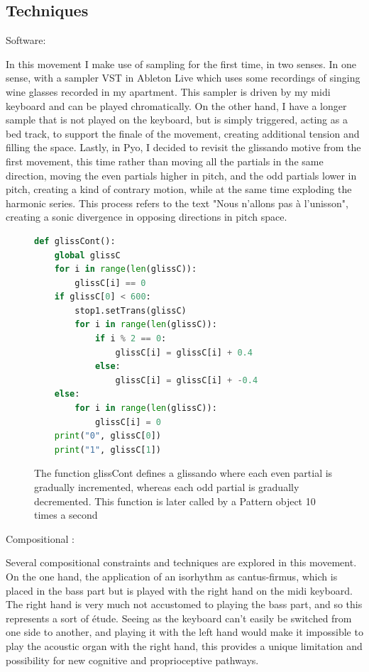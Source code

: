 \documentclass[12pt,twoside,maitrise]{dms_ks}
\theoremstyle{definition}
\begin{document}
\subsection{Techniques}

Software:

In this movement I make use of sampling for the first time, in two senses.
In one sense, with a sampler VST in Ableton Live which uses some recordings of singing wine glasses recorded in my apartment.
This sampler is driven by my midi keyboard and can be played chromatically.
On the other hand, I have a longer sample that is not played on the keyboard, but is simply triggered, acting as a bed track, to support the finale of the movement, creating additional tension and filling the space.
Lastly, in Pyo, I decided to revisit the glissando motive from the first movement, this time rather than moving all the partials in the same direction, moving the even partials higher in pitch, and the odd partials lower in pitch, creating a kind of contrary motion, while at the same time exploding the harmonic series.
This process refers to the text "Nous n'allons pas à l'unisson", creating a sonic divergence in opposing directions in pitch space.

\begin{figure}[H]
\begin{lstlisting}[language=Python]
def glissCont():
    global glissC
    for i in range(len(glissC)):
        glissC[i] == 0
    if glissC[0] < 600:
        stop1.setTrans(glissC)
        for i in range(len(glissC)):
            if i % 2 == 0:
                glissC[i] = glissC[i] + 0.4
            else:
                glissC[i] = glissC[i] + -0.4
    else:
        for i in range(len(glissC)):
            glissC[i] = 0
    print("0", glissC[0])
    print("1", glissC[1])
\end{lstlisting}
\caption{The function glissCont defines a glissando where each even partial is gradually incremented, whereas each odd partial is gradually decremented. This function is later called by a Pattern object 10 times a second}
\end{figure}

Compositional :

Several compositional constraints and techniques are explored in this movement.
On the one hand, the application of an isorhythm as cantus-firmus, which is placed in the bass part but is played with the right hand on the midi keyboard.
The right hand is very much not accustomed to playing the bass part, and so this represents a sort of étude.
Seeing as the keyboard can't easily be switched from one side to another, and playing it with the left hand would make it impossible to play the acoustic organ with the right hand, this provides a unique limitation and possibility for new cognitive and proprioceptive pathways.
\end{document}
